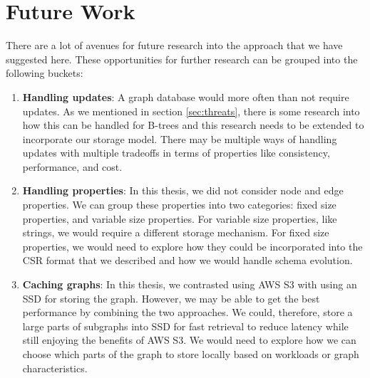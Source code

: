 \section{Future Work}\label{sec:futureWork}
There are a lot of avenues for future research into the approach that we have
suggested here. These opportunities for further research can be grouped into the
following buckets:
\begin{enumerate}
    \item \textbf{Handling updates}: A graph database would more often than not
        require updates. As we mentioned in section \ref{sec:threats}, there is
        some research into how this can be handled for B-trees and this research
        needs to be extended to incorporate our storage model. There may be
        multiple ways of handling updates with multiple tradeoffs in terms of
        properties like consistency, performance, and cost.
    \item \textbf{Handling properties}: In this thesis, we did not consider node
        and edge properties. We can group these properties into two categories:
        fixed size properties, and variable size properties. For variable size
        properties, like strings, we would require a different storage
        mechanism. For fixed size properties, we would need to explore how they
        could be incorporated into the CSR format that we described and how
        we would handle schema evolution.
    \item \textbf{Caching graphs}: In this thesis, we contrasted using AWS S3
        with using an SSD for storing the graph. However, we may be able to get
        the best performance by combining the two approaches. We could,
        therefore, store a large parts of subgraphs into SSD for fast retrieval
        to reduce latency while still enjoying the benefits of AWS S3. We would
        need to explore how we can choose which parts of the graph to store locally
        based on workloads or graph characteristics.
\end{enumerate}
